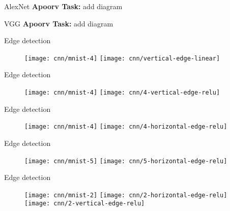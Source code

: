 \documentclass{beamer}
\newcommand{\red}[1]{{\color{red}\small \textbf{Apoorv Task:} #1}}
\begin{document}
\begin{frame}{AlexNet}
\red{add diagram}
\end{frame}

\begin{frame}{VGG}
\red{add diagram}
\end{frame}


\begin{frame}{Edge detection}


\begin{figure}
	\texttt{[image: cnn/mnist-4]}
	\hfill
	\texttt{[image: cnn/vertical-edge-linear]}
\end{figure}

\end{frame}

\begin{frame}{Edge detection}


\begin{figure}
	\texttt{[image: cnn/mnist-4]}
	\hfill
	\texttt{[image: cnn/4-vertical-edge-relu]}
\end{figure}

\end{frame}

\begin{frame}{Edge detection}


\begin{figure}
	\texttt{[image: cnn/mnist-4]}
	\hfill
	\texttt{[image: cnn/4-horizontal-edge-relu]}
\end{figure}

\end{frame}


\begin{frame}{Edge detection}


\begin{figure}
	\texttt{[image: cnn/mnist-5]}
	\hfill
	\texttt{[image: cnn/5-horizontal-edge-relu]}
\end{figure}

\end{frame}


\begin{frame}{Edge detection}


\begin{figure}
	\texttt{[image: cnn/mnist-2]}
	\hfill
	\texttt{[image: cnn/2-horizontal-edge-relu]}
	\hfill
		\texttt{[image: cnn/2-vertical-edge-relu]}
\end{figure}

\end{frame}
\end{document}
